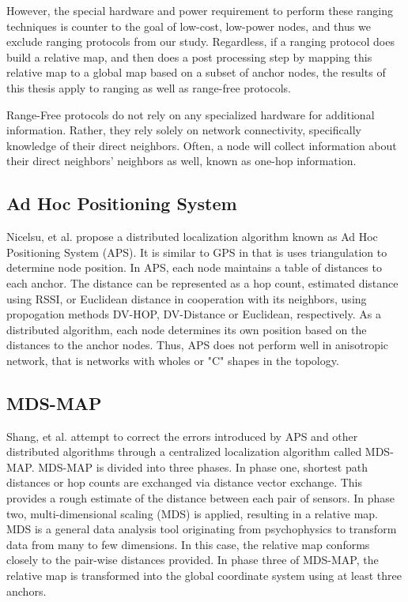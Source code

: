 However, the special hardware and power requirement to perform these ranging techniques is counter to the goal of low-cost, low-power nodes, and thus we exclude ranging protocols from our study.  Regardless, if a ranging protocol does build a relative map, and then does a post processing step by mapping this relative map to a global map based on a subset of anchor nodes, the results of this thesis apply to ranging as well as range-free protocols.

Range-Free protocols do not rely on any specialized hardware for additional information.  Rather, they rely solely on network connectivity, specifically knowledge of their direct neighbors.  Often, a node will collect information about their direct neighbors' neighbors as well, known as one-hop information.  

\subsection{Ad Hoc Positioning System}
Nicelsu, et al. propose a distributed localization algorithm known as Ad Hoc Positioning System (APS)\cite{APS}.  It is similar to GPS in that is uses triangulation to determine node position.  In APS, each node maintains a table of distances to each anchor.  The distance can be represented as a hop count, estimated distance using RSSI, or Euclidean distance in cooperation with its neighbors, using propogation methods DV-HOP, DV-Distance or Euclidean, respectively.  As a distributed algorithm, each node determines its own position based on the distances to the anchor nodes.  Thus, APS does not perform well in anisotropic network, that is networks with wholes or "C" shapes in the topology.  

\subsection{MDS-MAP}
Shang, et al. attempt to correct the errors introduced by APS and other distributed algorithms through a centralized localization algorithm called MDS-MAP\cite{MDS-MAP}.  MDS-MAP is divided into three phases.  In phase one, shortest path distances or hop counts are exchanged via distance vector exchange.  This provides a rough estimate of the distance between each pair of sensors.  In phase two, multi-dimensional scaling (MDS) is applied, resulting in a relative map.  MDS is a general data analysis tool originating from psychophysics to transform data from many to few dimensions.  In this case, the relative map conforms closely to the pair-wise distances provided.  In phase three of MDS-MAP, the relative map is transformed into the global coordinate system using at least three anchors.  


